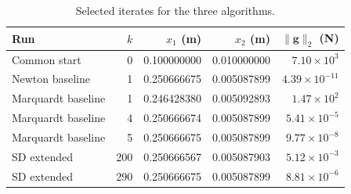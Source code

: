 \begin{table}[H]
\centering
\caption{Selected iterates for the three algorithms.}
\begin{tabular}{lrrrr}
\toprule
Run & $k$ & $x_1$ (m) & $x_2$ (m) & $\|\bm g\|_2$ (N)\\
\midrule
Common start & 0 & 0.100000000 & 0.010000000 & $7.10\times10^3$\\
Newton baseline & 1 & 0.250666675 & 0.005087899 & $4.39\times10^{-11}$\\
Marquardt baseline & 1 & 0.246428380 & 0.005092893 & $1.47\times10^2$\\
Marquardt baseline & 4 & 0.250666674 & 0.005087899 & $5.41\times10^{-5}$\\
Marquardt baseline & 5 & 0.250666675 & 0.005087899 & $9.77\times10^{-8}$\\
SD extended & 200 & 0.250666567 & 0.005087903 & $5.12\times10^{-3}$\\
SD extended & 290 & 0.250666675 & 0.005087899 & $8.81\times10^{-6}$\\
\bottomrule
\end{tabular}
\end{table}
